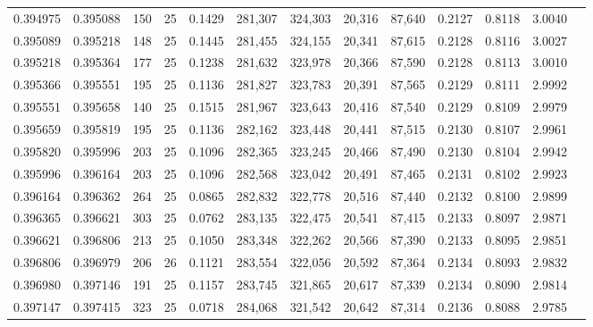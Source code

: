\begin{tabular}{rrrrrrrrrrrrr}
0.394975 & 0.395088 &   150 &  25 &                                     0.1429 & 281,307 & 324,303 &  20,316 &  87,640 & 0.2127 & 0.8118 & 3.0040 \\
0.395089 & 0.395218 &   148 &  25 &                                     0.1445 & 281,455 & 324,155 &  20,341 &  87,615 & 0.2128 & 0.8116 & 3.0027 \\
0.395218 & 0.395364 &   177 &  25 &                                     0.1238 & 281,632 & 323,978 &  20,366 &  87,590 & 0.2128 & 0.8113 & 3.0010 \\
0.395366 & 0.395551 &   195 &  25 &                                     0.1136 & 281,827 & 323,783 &  20,391 &  87,565 & 0.2129 & 0.8111 & 2.9992 \\
0.395551 & 0.395658 &   140 &  25 &                                     0.1515 & 281,967 & 323,643 &  20,416 &  87,540 & 0.2129 & 0.8109 & 2.9979 \\
0.395659 & 0.395819 &   195 &  25 &                                     0.1136 & 282,162 & 323,448 &  20,441 &  87,515 & 0.2130 & 0.8107 & 2.9961 \\
0.395820 & 0.395996 &   203 &  25 &                                     0.1096 & 282,365 & 323,245 &  20,466 &  87,490 & 0.2130 & 0.8104 & 2.9942 \\
0.395996 & 0.396164 &   203 &  25 &                                     0.1096 & 282,568 & 323,042 &  20,491 &  87,465 & 0.2131 & 0.8102 & 2.9923 \\
0.396164 & 0.396362 &   264 &  25 &                                     0.0865 & 282,832 & 322,778 &  20,516 &  87,440 & 0.2132 & 0.8100 & 2.9899 \\
0.396365 & 0.396621 &   303 &  25 &                                     0.0762 & 283,135 & 322,475 &  20,541 &  87,415 & 0.2133 & 0.8097 & 2.9871 \\
0.396621 & 0.396806 &   213 &  25 &                                     0.1050 & 283,348 & 322,262 &  20,566 &  87,390 & 0.2133 & 0.8095 & 2.9851 \\
0.396806 & 0.396979 &   206 &  26 &                                     0.1121 & 283,554 & 322,056 &  20,592 &  87,364 & 0.2134 & 0.8093 & 2.9832 \\
0.396980 & 0.397146 &   191 &  25 &                                     0.1157 & 283,745 & 321,865 &  20,617 &  87,339 & 0.2134 & 0.8090 & 2.9814 \\
0.397147 & 0.397415 &   323 &  25 &                                     0.0718 & 284,068 & 321,542 &  20,642 &  87,314 & 0.2136 & 0.8088 & 2.9785 \\

\end{tabular}
